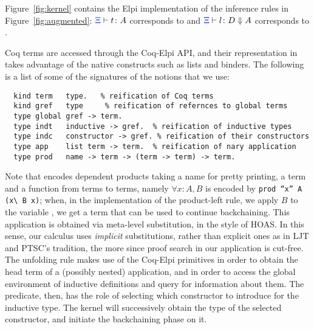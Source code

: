 %
%

Figure~\ref{fig:kernel} contains the Elpi implementation of the
inference rules in Figure~\ref{fig:augmented}: ${\color{blue}{\Xi}}\vdash t \colon A$ corresponds to
 and ${\color{blue}{\Xi}}\vdash l \colon D \Downarrow A$ corresponds to
.


Coq terms are accessed through the Coq-Elpi API, and their representation
in \lP takes advantage of the native \lP constructs such as lists and binders.
The following is a list of some of the signatures of the notions that we use:
\begin{lstlisting}
  kind term   type.   % reification of Coq terms
  kind gref   type     % reification of refernces to global terms
  type global gref -> term.
  type indt   inductive -> gref.  % reification of inductive types
  type indc   constructor -> gref. % reification of their constructors 
  type app    list term -> term.  % reification of nary application
  type prod   name -> term -> (term -> term) -> term.
\end{lstlisting}

Note that  encodes dependent products taking a name for pretty
printing, a term and a \lP function from terms to terms, namely $\forall x :
A, B$ is encoded by \texttt{prod ``x'' A (x\textbackslash{} B x)}; when, in the
implementation of the product-left rule, we apply $B$ to the variable
, we get a term that can be used to continue backchaining. This
application is obtained via meta-level substitution, in the style of HOAS. In
this sense, our calculus uses \emph{implicit} substitutions, rather than
explicit ones as in LJT and PTSC's tradition, the more since proof search in
our application is cut-free.
The unfolding rule makes use of the Coq-Elpi primitives
 in order to obtain the head term of a (possibly
nested) application, and  in order to access the global
environment of inductive definitions and query for information about them.
The  predicate, then, has the role of selecting which
constructor to introduce for the inductive type. The kernel will successively
obtain the type of the selected constructor, and initiate the backchaining
phase on it.

